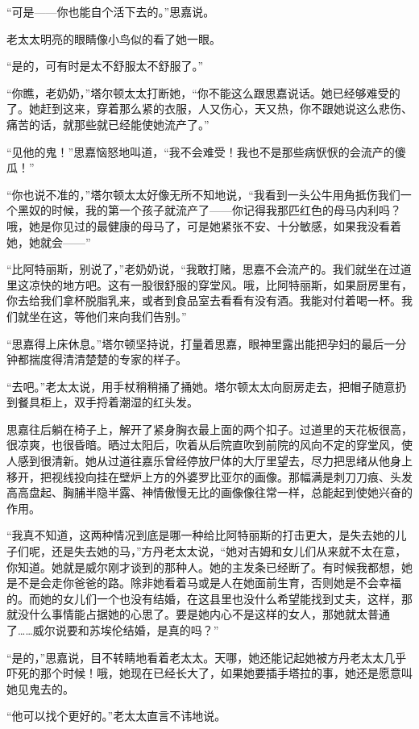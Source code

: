 \par “可是——你也能自个活下去的。”思嘉说。
\par 老太太明亮的眼睛像小鸟似的看了她一眼。
\par “是的，可有时是太不舒服太不舒服了。”
\par “你瞧，老奶奶，”塔尔顿太太打断她，“你不能这么跟思嘉说话。她已经够难受的了。她赶到这来，穿着那么紧的衣服，人又伤心，天又热，你不跟她说这么悲伤、痛苦的话，就那些就已经能使她流产了。”
\par “见他的鬼！”思嘉恼怒地叫道，“我不会难受！我也不是那些病恹恹的会流产的傻瓜！”
\par “你也说不准的，”塔尔顿太太好像无所不知地说，“我看到一头公牛用角抵伤我们一个黑奴的时候，我的第一个孩子就流产了——你记得我那匹红色的母马内利吗？哦，她是你见过的最健康的母马了，可是她紧张不安、十分敏感，如果我没看着她，她就会——”
\par “比阿特丽斯，别说了，”老奶奶说，“我敢打赌，思嘉不会流产的。我们就坐在过道里这凉快的地方吧。这有一股很舒服的穿堂风。哦，比阿特丽斯，如果厨房里有，你去给我们拿杯脱脂乳来，或者到食品室去看看有没有酒。我能对付着喝一杯。我们就坐在这，等他们来向我们告别。”
\par “思嘉得上床休息。”塔尔顿坚持说，打量着思嘉，眼神里露出能把孕妇的最后一分钟都揣度得清清楚楚的专家的样子。
\par “去吧。”老太太说，用手杖稍稍捅了捅她。塔尔顿太太向厨房走去，把帽子随意扔到餐具柜上，双手捋着潮湿的红头发。
\par 思嘉往后躺在椅子上，解开了紧身胸衣最上面的两个扣子。过道里的天花板很高，很凉爽，也很昏暗。晒过太阳后，吹着从后院直吹到前院的风向不定的穿堂风，使人感到很清新。她从过道往嘉乐曾经停放尸体的大厅里望去，尽力把思绪从他身上移开，把视线投向挂在壁炉上方的外婆罗比亚尔的画像。那幅满是刺刀刀痕、头发高高盘起、胸脯半隐半露、神情傲慢无比的画像像往常一样，总能起到使她兴奋的作用。
\par “我真不知道，这两种情况到底是哪一种给比阿特丽斯的打击更大，是失去她的儿子们呢，还是失去她的马，”方丹老太太说，“她对吉姆和女儿们从来就不太在意，你知道。她就是威尔刚才谈到的那种人。她的主发条已经断了。有时候我都想，她是不是会走你爸爸的路。除非她看着马或是人在她面前生育，否则她是不会幸福的。而她的女儿们一个也没有结婚，在这县里也没什么希望能找到丈夫，这样，那就没什么事情能占据她的心思了。要是她内心不是这样的女人，那她就太普通了……威尔说要和苏埃伦结婚，是真的吗？”
\par “是的，”思嘉说，目不转睛地看着老太太。天哪，她还能记起她被方丹老太太几乎吓死的那个时候！哦，她现在已经长大了，如果她要插手塔拉的事，她还是愿意叫她见鬼去的。
\par “他可以找个更好的。”老太太直言不讳地说。
